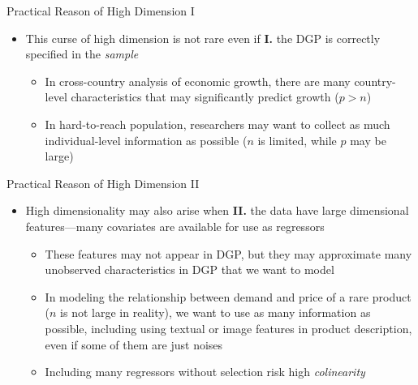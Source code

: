 \documentclass[aspectratio=1610,12pt,xcolor=dvipsnames]{beamer}
\begin{document}
\begin{frame}{Practical Reason of High Dimension I}

\begin{itemize}
    \item This curse of high dimension is not rare even if \textbf{I.} the DGP is correctly specified in the \textit{sample}
    \begin{itemize}
        \item In cross-country analysis of economic growth, there are many country-level characteristics that may significantly predict growth ($p>n$)
        \item In hard-to-reach population, researchers may want to collect as much individual-level information as possible ($n$ is limited, while $p$ may be large)
    \end{itemize}
\end{itemize}
    
\end{frame}

\begin{frame}{Practical Reason of High Dimension II}

\begin{itemize}
    \item High dimensionality may also arise when \textbf{II.} the data have large dimensional features—many covariates are available for use as regressors
    \begin{itemize}
        \item These features may not appear in DGP, but they may approximate many unobserved characteristics in DGP that we want to model
        \item In modeling the relationship between demand and price of a rare product ($n$ is not large in reality), we want to use as many information as possible, including using textual or image features in product description, even if some of them are just noises
        \item Including many regressors without selection risk high \textit{colinearity}
    \end{itemize}
\end{itemize}
\end{frame}
\end{document}
